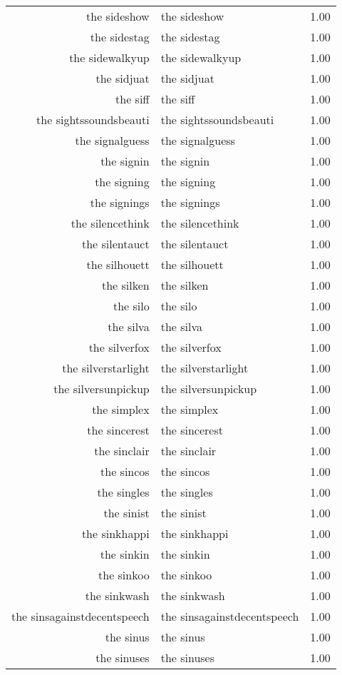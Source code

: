 \begin{table}[ht]
\begin{tabular}{rlr}
  the sideshow & the sideshow & 1.00 \\ 
  the sidestag & the sidestag & 1.00 \\ 
  the sidewalkyup & the sidewalkyup & 1.00 \\ 
  the sidjuat & the sidjuat & 1.00 \\ 
  the siff & the siff & 1.00 \\ 
  the sightssoundsbeauti & the sightssoundsbeauti & 1.00 \\ 
  the signalguess & the signalguess & 1.00 \\ 
  the signin & the signin & 1.00 \\ 
  the signing & the signing & 1.00 \\ 
  the signings & the signings & 1.00 \\ 
  the silencethink & the silencethink & 1.00 \\ 
  the silentauct & the silentauct & 1.00 \\ 
  the silhouett & the silhouett & 1.00 \\ 
  the silken & the silken & 1.00 \\ 
  the silo & the silo & 1.00 \\ 
  the silva & the silva & 1.00 \\ 
  the silverfox & the silverfox & 1.00 \\ 
  the silverstarlight & the silverstarlight & 1.00 \\ 
  the silversunpickup & the silversunpickup & 1.00 \\ 
  the simplex & the simplex & 1.00 \\ 
  the sincerest & the sincerest & 1.00 \\ 
  the sinclair & the sinclair & 1.00 \\ 
  the sincos & the sincos & 1.00 \\ 
  the singles & the singles & 1.00 \\ 
  the sinist & the sinist & 1.00 \\ 
  the sinkhappi & the sinkhappi & 1.00 \\ 
  the sinkin & the sinkin & 1.00 \\ 
  the sinkoo & the sinkoo & 1.00 \\ 
  the sinkwash & the sinkwash & 1.00 \\ 
  the sinsagainstdecentspeech & the sinsagainstdecentspeech & 1.00 \\ 
  the sinus & the sinus & 1.00 \\ 
  the sinuses & the sinuses & 1.00 \\ 

\end{tabular}
\end{table}
